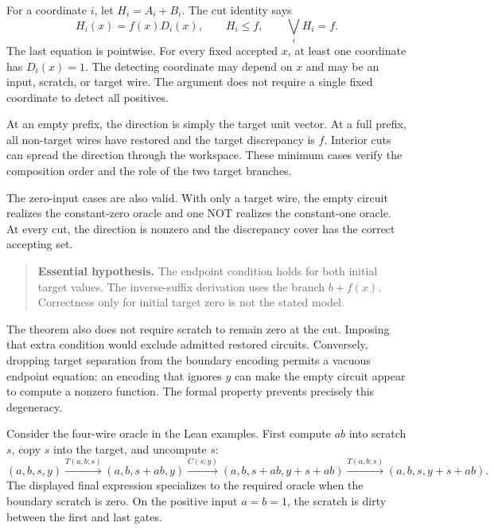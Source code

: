 
For a coordinate $i$, let $H_i=A_i+B_i$. The cut identity says
\[
 H_i(x)=f(x)D_i(x),\qquad H_i\le f,\qquad \bigvee_i H_i=f.
\]
The last equation is pointwise. For every fixed accepted $x$, at least one
coordinate has $D_i(x)=1$. The detecting coordinate may depend on $x$ and
may be an input, scratch, or target wire. The argument does not require a
single fixed coordinate to detect all positives.

At an empty prefix, the direction is simply the target unit vector. At a
full prefix, all non-target wires have restored and the target discrepancy
is $f$. Interior cuts can spread the direction through the workspace.
These minimum cases verify the composition order and the role of the two
target branches.

The zero-input cases are also valid. With only a target wire, the empty
circuit realizes the constant-zero oracle and one NOT realizes the
constant-one oracle. At every cut, the direction is nonzero and the
discrepancy cover has the correct accepting set.

\begin{quote}\small
\textbf{Essential hypothesis.} The endpoint condition holds for both initial
target values. The inverse-suffix derivation uses the branch $b+f(x)$.
Correctness only for initial target zero is not the stated model.
\end{quote}

The theorem also does not require scratch to remain zero at the cut. Imposing
that extra condition would exclude admitted restored circuits. Conversely,
dropping target separation from the boundary encoding permits a vacuous
endpoint equation: an encoding that ignores $y$ can make the empty circuit
appear to compute a nonzero function. The formal 
property prevents precisely this degeneracy.


Consider the four-wire oracle in the Lean examples. First compute $ab$ into
scratch $s$, copy $s$ into the target, and uncompute $s$:
\[
 (a,b,s,y)\xrightarrow{T(a,b;s)}(a,b,s+ab,y)
 \xrightarrow{C(s;y)}(a,b,s+ab,y+s+ab)
 \xrightarrow{T(a,b;s)}(a,b,s,y+s+ab).
\]
The displayed final expression specializes to the required oracle when
the boundary scratch is zero. On the positive input $a=b=1$, the scratch
is dirty between the first and last gates.

